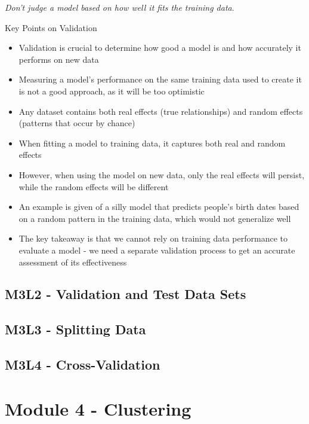 \documentclass[
]{book}
\providecommand{\tightlist}{%
  \setlength{\itemsep}{0pt}\setlength{\parskip}{0pt}}
\begin{document}
\emph{Don't judge a model based on how well it fits the training data}.

Key Points on Validation

\begin{itemize}
\tightlist
\item
  Validation is crucial to determine how good a model is and how accurately it performs on new data
\item
  Measuring a model's performance on the same training data used to create it is not a good approach, as it will be too optimistic
\item
  Any dataset contains both real effects (true relationships) and random effects (patterns that occur by chance)
\item
  When fitting a model to training data, it captures both real and random effects
\item
  However, when using the model on new data, only the real effects will persist, while the random effects will be different
\item
  An example is given of a silly model that predicts people's birth dates based on a random pattern in the training data, which would not generalize well
\item
  The key takeaway is that we cannot rely on training data performance to evaluate a model - we need a separate validation process to get an accurate assessment of its effectiveness
\end{itemize}

\section{M3L2 - Validation and Test Data Sets}\label{m3l2---validation-and-test-data-sets}

\section{M3L3 - Splitting Data}\label{m3l3---splitting-data}

\section{M3L4 - Cross-Validation}\label{m3l4---cross-validation}

\chapter{Module 4 - Clustering}\label{module-4---clustering}
\end{document}
